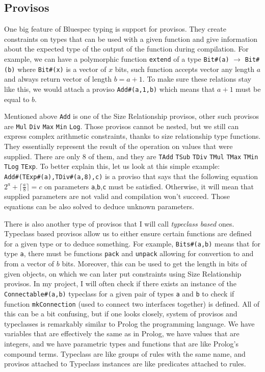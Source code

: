 \documentclass[12pt]{report}
\begin{document}
\subsection{Provisos}
\label{sec:Provisos}
One big feature of Bluespec typing is support for provisos. They create constraints on types that can be used with a given function and give information about the expected type of the output of the function during compilation. For example, we can have a polymorphic function \verb!extend! of a type \verb!Bit#(a)! $\rightarrow$ \verb!Bit#(b)! where \verb!Bit#(x)! is a vector of $x$ bits, such function accepts vector any length $a$ and always return vector of length $b=a+1$. To make sure these relations stay like this, we would attach a proviso \verb!Add#(a,1,b)! which means that $a+1$ must be equal to $b$.  
\par  
Mentioned above \verb!Add! is one of the Size Relationship provisos, other such provisos are \verb!Mul! \verb!Div! \verb!Max! \verb!Min! \verb!Log!.  
Those provisos cannot be nested, but we still can express complex arithmetic constraints, thanks to size relationship type functions.  
They essentially represent the result of the operation on values that were supplied. There are only 8 of them, and they are \verb!TAdd! \verb!TSub! \verb!TDiv! \verb!TMul! \verb!TMax! \verb!TMin! \verb!TLog! \verb!TExp!.  
To better explain this, let us look at this simple example: \\  
\verb!Add#(TExp#(a),TDiv#(a,8),c)! is a proviso that says that the following equation $2^a+\lceil\frac{a}{8}\rceil = c$ on parameters \verb!a!,\verb!b!,\verb!c! must be satisfied. Otherwise, it will mean that supplied parameters are not valid and compilation won't succeed. Those equations can be also solved to deduce unknown parameters.  
\par  
There is also another type of provisos that I will call \emph{typeclass based} ones.  
Typeclass based provisos allow us to either ensure certain functions are defined for a given type or to deduce something. For example, \verb!Bits#(a,b)! means that for type \verb!a!, there must be functions \verb!pack! and \verb!unpack! allowing for convertion to and from a vector of $b$ bits. Moreover, this can be used to get the length in bits of given objects, on which we can later put constraints using Size Relationship provisos.  
In my project, I will often check if there exists an instance of the \verb!Connectable#(a,b)! typeclass for a given pair of types \verb!a! and \verb!b! to check if function \verb!mkConnection! (used to connect two interfaces together) is defined.  
All of this can be a bit confusing, but if one looks closely, system of provisos and typeclasses is remarkably similar to Prolog the programming language. We have variables that are effectively the same as in Prolog, we have values that are integers, and we have parametric types and functions that are like Prolog's compound terms. Typeclass are like groups of rules with the same name, and provisos attached to Typeclass instances are like predicates attached to rules.  
\end{document}
